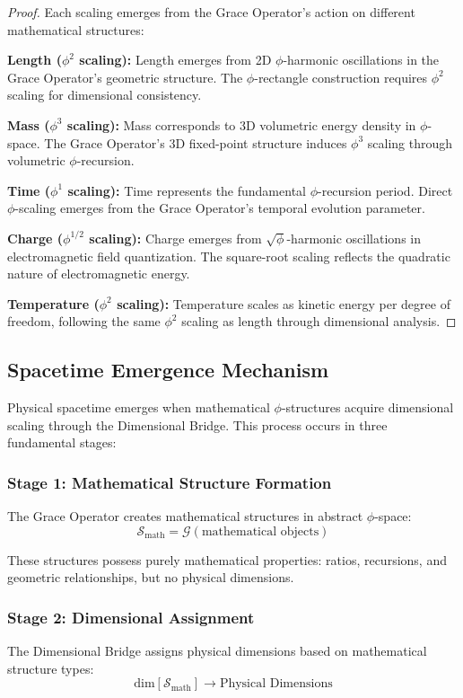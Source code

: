 \begin{proof}
Each scaling emerges from the Grace Operator's action on different mathematical structures:

\textbf{Length ($\phi^2$ scaling):} Length emerges from 2D $\phi$-harmonic oscillations in the Grace Operator's geometric structure. The $\phi$-rectangle construction requires $\phi^2$ scaling for dimensional consistency.

\textbf{Mass ($\phi^3$ scaling):} Mass corresponds to 3D volumetric energy density in $\phi$-space. The Grace Operator's 3D fixed-point structure induces $\phi^3$ scaling through volumetric $\phi$-recursion.

\textbf{Time ($\phi^1$ scaling):} Time represents the fundamental $\phi$-recursion period. Direct $\phi$-scaling emerges from the Grace Operator's temporal evolution parameter.

\textbf{Charge ($\phi^{1/2}$ scaling):} Charge emerges from $\sqrt{\phi}$-harmonic oscillations in electromagnetic field quantization. The square-root scaling reflects the quadratic nature of electromagnetic energy.

\textbf{Temperature ($\phi^2$ scaling):} Temperature scales as kinetic energy per degree of freedom, following the same $\phi^2$ scaling as length through dimensional analysis.
\end{proof}

\subsection{Spacetime Emergence Mechanism}

Physical spacetime emerges when mathematical $\phi$-structures acquire dimensional scaling through the Dimensional Bridge. This process occurs in three fundamental stages:

\subsubsection{Stage 1: Mathematical Structure Formation}
The Grace Operator creates mathematical structures in abstract $\phi$-space:
\begin{equation}
\mathcal{S}_{\text{math}} = \mathcal{G}(\text{mathematical objects})
\end{equation}

These structures possess purely mathematical properties: ratios, recursions, and geometric relationships, but no physical dimensions.

\subsubsection{Stage 2: Dimensional Assignment}
The Dimensional Bridge assigns physical dimensions based on mathematical structure types:
\begin{equation}
\text{dim}[\mathcal{S}_{\text{math}}] \rightarrow \text{Physical Dimensions}
\end{equation}

